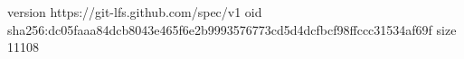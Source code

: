 version https://git-lfs.github.com/spec/v1
oid sha256:dc05faaa84dcb8043e465f6e2b9993576773cd5d4dcfbcf98ffccc31534af69f
size 11108
